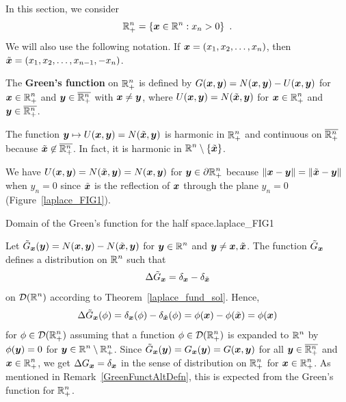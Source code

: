 In this section, we consider
\[
\mathbb{R}^n_+ = \left\{ {\bm{x}} \in \mathbb{R}^n : x_n >0 \right\} \ .
\]
We will also use the following notation.  If
${\bm{x}} = (x_1, x_2, \ldots, x_n)$, then \\
$\tilde{{\bm{x}}} = (x_1, x_2, \ldots, x_{n-1}, -x_n)$.

The {\bfseries Green's function} on
$\displaystyle \mathbb{R}^n_+$ is defined by
$G({\bm{x}},{\bm{y}}) = N({\bm{x}},{\bm{y}}) - U({\bm{x}},{\bm{y}})$
for $\displaystyle {\bm{x}} \in \mathbb{R}_+^n$ and
$\displaystyle {\bm{y}} \in \overline{\mathbb{R}^n_+}$ with
${\bm{x}} \neq {\bm{y}}$, where
$U({\bm{x}},{\bm{y}}) = N(\tilde{{\bm{x}}}, {\bm{y}})$
for $\displaystyle {\bm{x}} \in \mathbb{R}_+^n$ and
$\displaystyle {\bm{y}} \in \overline{\mathbb{R}^n_+}$.

 The function
${\bm{y}} \mapsto U({\bm{x}},{\bm{y}}) =
N(\tilde{{\bm{x}}},{\bm{y}})$ is harmonic in $\displaystyle \mathbb{R}^n_+$ and
continuous on $\displaystyle \overline{\mathbb{R}^n_+}$ because
$\displaystyle \tilde{{\bm{x}}} \not\in \overline{\mathbb{R}^n_+}$.
In fact, it is harmonic in $\displaystyle \mathbb{R}^n \setminus \{\tilde{{\bm{x}}}\}$.

 We have
$U({\bm{x}},{\bm{y}}) = N(\tilde{{\bm{x}}},{\bm{y}}) = N({\bm{x}},{\bm{y}})$ for
$\displaystyle {\bm{y}} \in \partial \mathbb{R}^n_+$ because
$\|{\bm{x}}-{\bm{y}}\| = \|\tilde{{\bm{x}}}-{\bm{y}}\|$ when $y_n=0$ since
$\tilde{{\bm{x}}}$ is the reflection of ${\bm{x}}$ through the
plane $y_n=0$ (Figure~\ref{laplace_FIG1}).

{Domain of the Green's function for the half space.}{laplace_FIG1}

Let $\tilde{G}_{{\bm{x}}}({\bm{y}}) =
N({\bm{x}},{\bm{y}}) - N(\tilde{{\bm{x}}},{\bm{y}})$
for $\displaystyle {\bm{y}} \in \mathbb{R}^n$ and ${\bm{y}}\neq {\bm{x}},\tilde{{\bm{x}}}$.
The function $\tilde{G}_{{\bm{x}}}$ defines a distribution on
$\displaystyle \mathbb{R}^n$ such that
\[
\Delta \tilde{G}_{{\bm{x}}} = \delta_{{\bm{x}}} - \delta_{\tilde{{\bm{x}}}}
\]
on $\displaystyle \mathcal{D}(\mathbb{R}^n)$ according to
Theorem~\ref{laplace_fund_sol}.  Hence,
\[
\Delta \tilde{G}_{{\bm{x}}}(\phi) = \delta_{{\bm{x}}}(\phi) -
\delta_{\tilde{{\bm{x}}}}(\phi)
= \phi({\bm{x}}) - \phi(\tilde{{\bm{x}}}) = \phi({\bm{x}})
\]
for $\displaystyle \phi \in \mathcal{D}(\mathbb{R}^n_+)$ assuming that a function
$\displaystyle \phi \in \mathcal{D}(\mathbb{R}^n_+)$ is expanded to $\displaystyle \mathbb{R}^n$
by $\phi({\bm{y}})=0$ for
$\displaystyle {\bm{y}} \in \mathbb{R}^n \setminus \mathbb{R}^n_+$.  Since
$\tilde{G}_{{\bm{x}}}({\bm{y}}) = G_{{\bm{x}}}({\bm{y}}) = G({\bm{x}},{\bm{y}})$
for all $\displaystyle {\bm{y}} \in \overline{\mathbb{R}^n_+}$ and
$\displaystyle {\bm{x}}\in \mathbb{R}_+^n$, we get
$\Delta G_{{\bm{x}}} = \delta_{{\bm{x}}}$ in the sense of distribution
on $\displaystyle \mathbb{R}^n_+$ for $\displaystyle {\bm{x}}\in \mathbb{R}_+^n$.
As mentioned in Remark~\ref{GreenFunctAltDefn}, this is expected from
the Green's function for $\displaystyle \mathbb{R}^n_+$.

